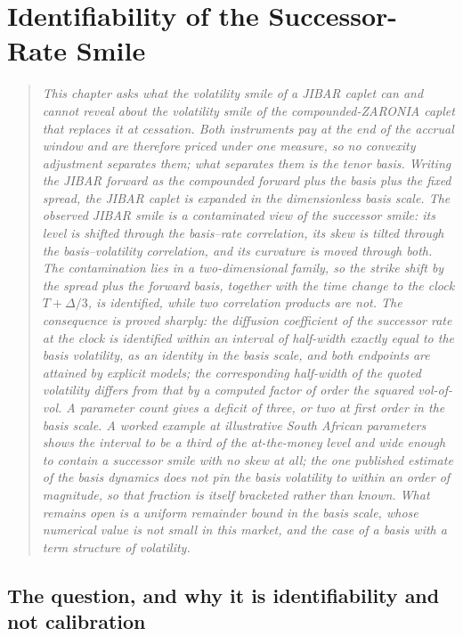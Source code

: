 \documentclass[../../../main.tex]{subfiles}
\begin{document}
\chapter{Identifiability of the Successor-Rate Smile}\label{ch5-identifiability}\label{ch:identifiability}

\begin{quote}\itshape
This chapter asks what the volatility smile of a JIBAR caplet can and cannot reveal about the volatility smile of the compounded-ZARONIA caplet that replaces it at cessation. Both instruments pay at the end of the accrual window and are therefore priced under one measure, so no convexity adjustment separates them; what separates them is the tenor basis. Writing the JIBAR forward as the compounded forward plus the basis plus the fixed spread, the JIBAR caplet is expanded in the dimensionless basis scale. The observed JIBAR smile is a contaminated view of the successor smile: its level is shifted through the basis--rate correlation, its skew is tilted through the basis--volatility correlation, and its curvature is moved through both. The contamination lies in a two-dimensional family, so the strike shift by the spread plus the forward basis, together with the time change to the clock $T+\Delta/3$, is identified, while two correlation products are not. The consequence is proved sharply: the diffusion coefficient of the successor rate at the clock is identified within an interval of half-width exactly equal to the basis volatility, as an identity in the basis scale, and both endpoints are attained by explicit models; the corresponding half-width of the quoted volatility differs from that by a computed factor of order the squared vol-of-vol. A parameter count gives a deficit of three, or two at first order in the basis scale. A worked example at illustrative South African parameters shows the interval to be a third of the at-the-money level and wide enough to contain a successor smile with no skew at all; the one published estimate of the basis dynamics does not pin the basis volatility to within an order of magnitude, so that fraction is itself bracketed rather than known. What remains open is a uniform remainder bound in the basis scale, whose numerical value is not small in this market, and the case of a basis with a term structure of volatility.
\end{quote}

\section{The question, and why it is identifiability and not calibration}\label{sec:ident-question}
\end{document}
